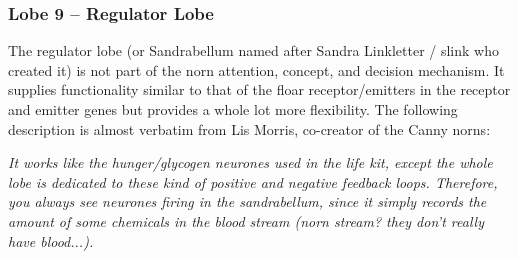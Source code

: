 \documentclass[11pt,twoside,a4paper]{article}
\begin{document}
\subsubsection{Lobe 9 -- Regulator Lobe}


The regulator lobe (or Sandrabellum named after Sandra Linkletter / slink who created it) is not part of the norn attention, concept, and decision mechanism. It supplies functionality similar to that of the floar receptor/emitters in the receptor and emitter genes but provides a whole lot more flexibility. The following description is almost verbatim from Lis Morris, co-creator of the Canny norns:

\emph{It works like the hunger/glycogen neurones used in the life kit, except the whole lobe is dedicated to these kind of positive and negative feedback loops. Therefore, you always see neurones firing in the sandrabellum, since it simply records the amount of some chemicals in the blood stream (norn stream? they don't really have blood...).}~\\
\end{document}
